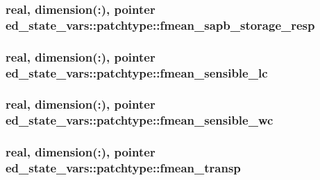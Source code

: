 \subsubsection[{\texorpdfstring{fmean\+\_\+sapb\+\_\+storage\+\_\+resp}{fmean_sapb_storage_resp}}]{\setlength{\rightskip}{0pt plus 5cm}real, dimension(\+:), pointer ed\+\_\+state\+\_\+vars\+::patchtype\+::fmean\+\_\+sapb\+\_\+storage\+\_\+resp}\hypertarget{structed__state__vars_1_1patchtype_a3dae71b3f088e002571b6f0dd628456f}{}\label{structed__state__vars_1_1patchtype_a3dae71b3f088e002571b6f0dd628456f}
\subsubsection[{\texorpdfstring{fmean\+\_\+sensible\+\_\+lc}{fmean_sensible_lc}}]{\setlength{\rightskip}{0pt plus 5cm}real, dimension(\+:), pointer ed\+\_\+state\+\_\+vars\+::patchtype\+::fmean\+\_\+sensible\+\_\+lc}\hypertarget{structed__state__vars_1_1patchtype_a9bc8d8d786a2fcaef5cd04c6b979b781}{}\label{structed__state__vars_1_1patchtype_a9bc8d8d786a2fcaef5cd04c6b979b781}
\subsubsection[{\texorpdfstring{fmean\+\_\+sensible\+\_\+wc}{fmean_sensible_wc}}]{\setlength{\rightskip}{0pt plus 5cm}real, dimension(\+:), pointer ed\+\_\+state\+\_\+vars\+::patchtype\+::fmean\+\_\+sensible\+\_\+wc}\hypertarget{structed__state__vars_1_1patchtype_a8eebd637f78cb8a8704a92c3bdae4103}{}\label{structed__state__vars_1_1patchtype_a8eebd637f78cb8a8704a92c3bdae4103}
\subsubsection[{\texorpdfstring{fmean\+\_\+transp}{fmean_transp}}]{\setlength{\rightskip}{0pt plus 5cm}real, dimension(\+:), pointer ed\+\_\+state\+\_\+vars\+::patchtype\+::fmean\+\_\+transp}\hypertarget{structed__state__vars_1_1patchtype_a0723fcbcf3243310c622608b6a1e557e}{}\label{structed__state__vars_1_1patchtype_a0723fcbcf3243310c622608b6a1e557e}
